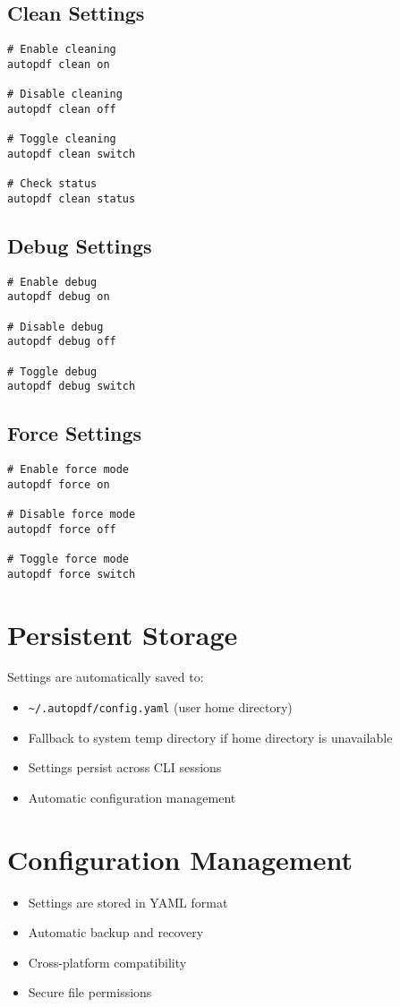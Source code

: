 \documentclass{article}
\begin{document}
\subsection{Clean Settings}
\begin{verbatim}
# Enable cleaning
autopdf clean on

# Disable cleaning
autopdf clean off

# Toggle cleaning
autopdf clean switch

# Check status
autopdf clean status
\end{verbatim}

\subsection{Debug Settings}
\begin{verbatim}
# Enable debug
autopdf debug on

# Disable debug
autopdf debug off

# Toggle debug
autopdf debug switch
\end{verbatim}

\subsection{Force Settings}
\begin{verbatim}
# Enable force mode
autopdf force on

# Disable force mode
autopdf force off

# Toggle force mode
autopdf force switch
\end{verbatim}

\section{Persistent Storage}
Settings are automatically saved to:
\begin{itemize}
\item \texttt{\textasciitilde/.autopdf/config.yaml} (user home directory)
\item Fallback to system temp directory if home directory is unavailable
\item Settings persist across CLI sessions
\item Automatic configuration management
\end{itemize}

\section{Configuration Management}
\begin{itemize}
\item Settings are stored in YAML format
\item Automatic backup and recovery
\item Cross-platform compatibility
\item Secure file permissions
\end{itemize}
\end{document}
